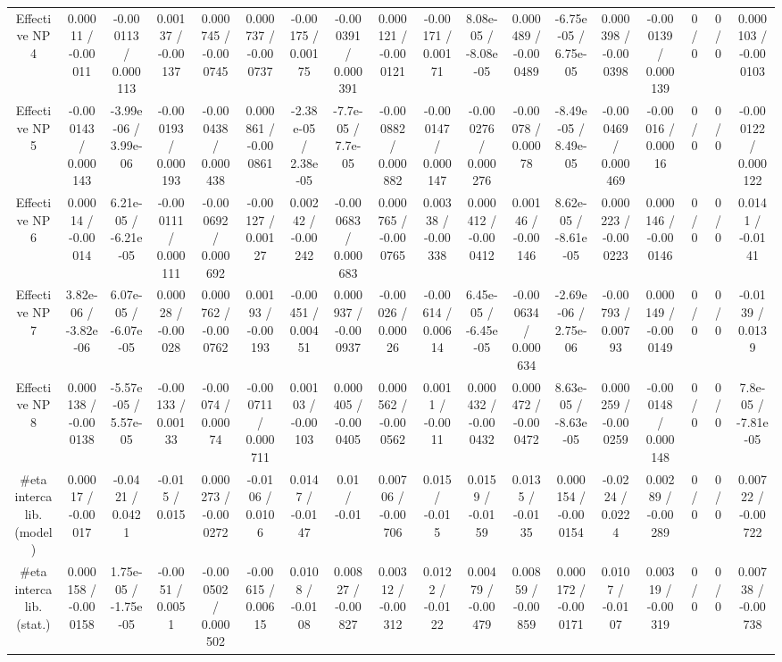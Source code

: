 \documentclass[10pt]{article}
\begin{document}
\begin{table}[htbp]
\begin{center}
\begin{tabular}{|c|c|c|c|c|c|c|c|c|c|c|c|c|c|c|c|c|c|}
  Effective NP 4 & 0.00011 / -0.00011 & -0.000113 / 0.000113 & 0.00137 / -0.00137 & 0.000745 / -0.000745 & 0.000737 / -0.000737 & -0.00175 / 0.00175 & -0.000391 / 0.000391 & 0.000121 / -0.000121 & -0.00171 / 0.00171 & 8.08e-05 / -8.08e-05 & 0.000489 / -0.000489 & -6.75e-05 / 6.75e-05 & 0.000398 / -0.000398 & -0.000139 / 0.000139 & 0 / 0 & 0 / 0 & 0.000103 / -0.000103 \\ 
  Effective NP 5 & -0.000143 / 0.000143 & -3.99e-06 / 3.99e-06 & -0.000193 / 0.000193 & -0.000438 / 0.000438 & 0.000861 / -0.000861 & -2.38e-05 / 2.38e-05 & -7.7e-05 / 7.7e-05 & -0.000882 / 0.000882 & -0.000147 / 0.000147 & -0.000276 / 0.000276 & -0.00078 / 0.00078 & -8.49e-05 / 8.49e-05 & -0.000469 / 0.000469 & -0.00016 / 0.00016 & 0 / 0 & 0 / 0 & -0.000122 / 0.000122 \\ 
  Effective NP 6 & 0.00014 / -0.00014 & 6.21e-05 / -6.21e-05 & -0.000111 / 0.000111 & -0.000692 / 0.000692 & -0.00127 / 0.00127 & 0.00242 / -0.00242 & -0.000683 / 0.000683 & 0.000765 / -0.000765 & 0.00338 / -0.00338 & 0.000412 / -0.000412 & 0.00146 / -0.00146 & 8.62e-05 / -8.61e-05 & 0.000223 / -0.000223 & 0.000146 / -0.000146 & 0 / 0 & 0 / 0 & 0.0141 / -0.0141 \\ 
  Effective NP 7 & 3.82e-06 / -3.82e-06 & 6.07e-05 / -6.07e-05 & 0.00028 / -0.00028 & 0.000762 / -0.000762 & 0.00193 / -0.00193 & -0.00451 / 0.00451 & 0.000937 / -0.000937 & -0.00026 / 0.00026 & -0.00614 / 0.00614 & 6.45e-05 / -6.45e-05 & -0.000634 / 0.000634 & -2.69e-06 / 2.75e-06 & -0.00793 / 0.00793 & 0.000149 / -0.000149 & 0 / 0 & 0 / 0 & -0.0139 / 0.0139 \\ 
  Effective NP 8 & 0.000138 / -0.000138 & -5.57e-05 / 5.57e-05 & -0.00133 / 0.00133 & -0.00074 / 0.00074 & -0.000711 / 0.000711 & 0.00103 / -0.00103 & 0.000405 / -0.000405 & 0.000562 / -0.000562 & 0.0011 / -0.0011 & 0.000432 / -0.000432 & 0.000472 / -0.000472 & 8.63e-05 / -8.63e-05 & 0.000259 / -0.000259 & -0.000148 / 0.000148 & 0 / 0 & 0 / 0 & 7.8e-05 / -7.81e-05 \\ 
  #eta intercalib. (model) & 0.00017 / -0.00017 & -0.0421 / 0.0421 & -0.015 / 0.015 & 0.000273 / -0.000272 & -0.0106 / 0.0106 & 0.0147 / -0.0147 & 0.01 / -0.01 & 0.00706 / -0.00706 & 0.015 / -0.015 & 0.0159 / -0.0159 & 0.0135 / -0.0135 & 0.000154 / -0.000154 & -0.0224 / 0.0224 & 0.00289 / -0.00289 & 0 / 0 & 0 / 0 & 0.00722 / -0.00722 \\ 
  #eta intercalib. (stat.) & 0.000158 / -0.000158 & 1.75e-05 / -1.75e-05 & -0.0051 / 0.0051 & -0.000502 / 0.000502 & -0.00615 / 0.00615 & 0.0108 / -0.0108 & 0.00827 / -0.00827 & 0.00312 / -0.00312 & 0.0122 / -0.0122 & 0.00479 / -0.00479 & 0.00859 / -0.00859 & 0.000172 / -0.000171 & 0.0107 / -0.0107 & 0.00319 / -0.00319 & 0 / 0 & 0 / 0 & 0.00738 / -0.00738 \\ 

\end{tabular}
\end{center}
\end{table}
\end{document}
